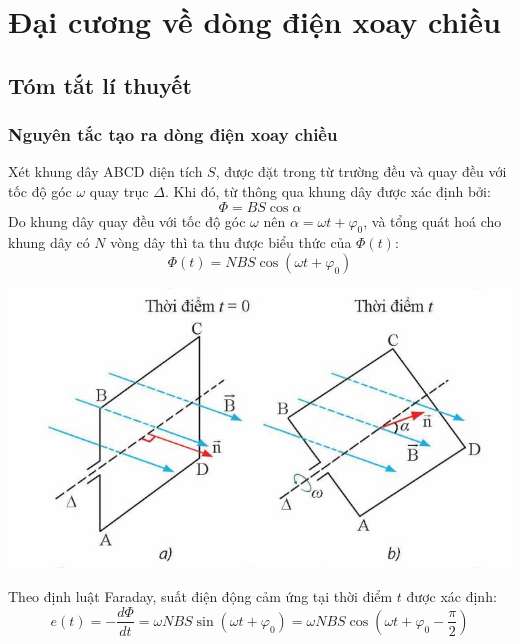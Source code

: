\section{Đại cương về dòng điện xoay chiều}
\subsection{Tóm tắt lí thuyết}
\begin{tomtat}
\subsubsection{Nguyên tắc tạo ra dòng điện xoay chiều}
\begin{minipage}{0.5\textwidth}
	Xét khung dây ABCD diện tích $S$, được đặt trong từ trường đều và quay đều với tốc độ góc $\omega$ quay trục $\Delta$. Khi đó, từ thông qua khung dây được xác định bởi:
	\begin{equation}
		\Phi=BS\cos\alpha
	\end{equation}
	Do khung dây quay đều với tốc độ góc $\omega$ nên $\alpha=\omega t+\varphi_0$, và tổng quát hoá cho khung dây có $N$ vòng dây thì ta thu được biểu thức của $\Phi\left(t\right)$:
	\begin{equation}
		\Phi\left(t\right)=NBS\cos\left(\omega t+\varphi_0\right)
	\end{equation}
\end{minipage}
\hfill
\begin{minipage}{0.5\textwidth}
	\centering
	\includegraphics[width=1\linewidth]{figs/VN12-Y24-PH-SYL-023-1}
\end{minipage}
Theo định luật Faraday, suất điện động cảm ứng tại thời điểm $t$ được xác định:
\begin{equation}
	e\left(t\right)=-\dfrac{d\Phi}{dt}=\omega NBS\sin\left(\omega t+\varphi_0\right)=\omega NBS\cos\left(\omega t+\varphi_0-\dfrac{\pi}{2}\right)

\end{equation}
\end{tomtat}
